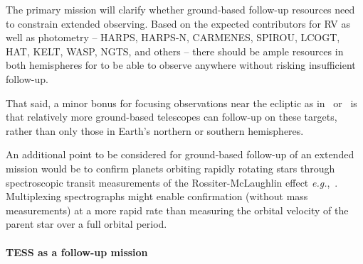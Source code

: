 \begin{itemize}
	The primary mission will clarify whether ground-based follow-up resources need to constrain \tesss extended observing.
	Based on the expected contributors for RV as well as photometry -- HARPS, HARPS-N, CARMENES, SPIROU, LCOGT, HAT, KELT, WASP, NGTS, and others -- there should be ample resources in both hemispheres for \tess to be able to observe anywhere without risking insufficient follow-up.

	That said, a minor bonus for focusing \tess observations near the ecliptic as in \elong\ or \eshort\ is that relatively more ground-based telescopes can follow-up on these targets, rather than only those in Earth's northern or southern hemispheres.
	
	An additional point to be considered for ground-based follow-up of an extended mission would be to confirm \tess planets orbiting rapidly rotating stars through spectroscopic transit measurements of the Rossiter-McLaughlin effect \textit{e.g.},~\citep{gaudi_prospects_2007}.
	Multiplexing spectrographs might enable confirmation (without mass measurements) at a more rapid rate than measuring the orbital velocity of the parent star over a full orbital period.
	
\end{itemize}




\paragraph{TESS as a follow-up mission}
\label{par:TESS_as_followup}


